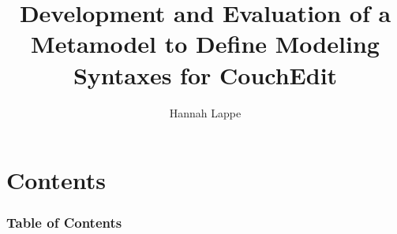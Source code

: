 \documentclass{beamer}
\title{Development and Evaluation of a Metamodel to Define Modeling Syntaxes for CouchEdit}
\author{Hannah Lappe}
\institute
{Institut für Softwaretechnik und Programmiersprachen\\}
\begin{document}
\hspace*{-1.49cm}
\frame[plain]{\titlepage}

\hspace*{-0.7cm}
\section*{Contents} %
\begin{frame}
  \frametitle{Table of Contents}
  \tableofcontents
\end{frame}






\end{document}

